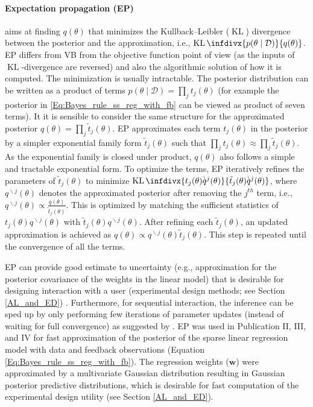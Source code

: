 \documentclass[dissertation,math,vertlayout,pdfa,colorlinks]{aaltoseries}
\newcommand{\bw}{\bm{w}}
\newcommand{\bD}{\mathcal{D}}
\DeclareMathOperator{\KLt}{KL}
\newcommand{\KL}{\KLt\infdivx}
\begin{document}
\paragraph{Expectation propagation (EP)} \cite{minka2001expectation} aims at finding $q(\theta)$ that minimizes the Kullback–Leibler ($\KLt$) divergence between the posterior and the approximation, i.e., $\KL{p(\theta \mid \bD)}{q(\theta)}$. EP differs from VB from the objective function point of view (as the inputs of $\KLt$-divergence are reversed) and also the algorithmic solution of how it is computed. The minimization is usually intractable. The posterior distribution can be written as a product of terms $p(\theta \mid \bD) = \prod_{j} t_j(\theta)$ (for example the posterior in \ref{Eq:Bayes_rule_ss_reg_with_fb} can be viewed as product of seven terms). It it is sensible to consider the same structure for the approximated posterior $q(\theta) = \prod_{j} \tilde{t}_j(\theta)$. %
EP approximates each term $t_j(\theta)$ in the posterior by a simpler exponential family form $\tilde{t}_j(\theta)$ such that $\prod_{j} t_j(\theta) \approx \prod_{j}\tilde{t}_j(\theta)$. As the exponential family is closed under product, $q(\theta)$ also follows a simple and tractable exponential form. To optimize the terms, EP iteratively refines the parameters of $\tilde{t}_j(\theta)$ to minimize $\KL{t_j(\theta) q^{\!\!\!\backslash j}(\theta)} {\tilde{t}_j(\theta) q^{\!\!\!\backslash j}(\theta)}$, where $q^{\!\!\!\backslash j}(\theta)$ denotes the approximated posterior after removing the $j^{th}$ term, i.e.,  $q^{\!\!\!\backslash j}(\theta) \propto \frac{q(\theta)}{\tilde{t}_j(\theta)}$. This is optimized by matching the sufficient statistics of $t_j(\theta) q^{\!\!\!\backslash j}(\theta)$ with $\tilde{t}_j(\theta) q^{\!\!\!\backslash j}(\theta)$. After refining each $\tilde{t}_j(\theta)$, an updated approximation is achieved as $q(\theta)\propto q^{\!\!\!\backslash j}(\theta) \tilde{t}_j(\theta)$. This step is repeated until the convergence of all the terms.  \cite{hernandez2013generalized,Lobato2015ML,Tomi_P_thesis}
	
EP can provide good estimate to uncertainty (e.g., approximation for the posterior covariance of the weights in the linear model) that is desirable for designing interaction with a user (experimental design methods; see Section \ref{AL_and_ED}) \cite{hernandez2013generalized}. Furthermore, for sequential interaction, the inference can be sped up by only performing few iterations of parameter updates (instead of waiting for full convergence) as suggested by \cite{seeger2008bayesian}. EP was used in Publication II, III, and IV for fast approximation of the posterior of the sparse linear regression model %
with data and feedback observations (Equation \ref{Eq:Bayes_rule_ss_reg_with_fb}). The regression weights ($\bw$) were approximated by a multivariate Gaussian distribution resulting in Gaussian posterior predictive distributions, which is desirable for fast computation of the experimental design utility (see Section \ref{AL_and_ED}).  
	
\end{document}
